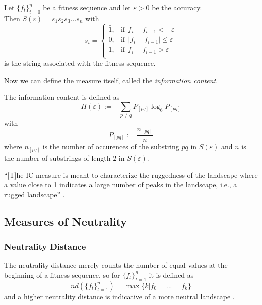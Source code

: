 \documentclass[
  a4paper,  %
  twoside,  %
  bibliography=totoc,
  headsepline,
  cleardoublepage=empty,
  parskip=half,
  draft=false
]{scrbook}
\begin{document}
\begin{definition}\label{def:string}
	Let $\{f_{t}\}_{t = 0}^{n}$ be a fitness sequence and let $\varepsilon > 0$ be the accuracy.\\
	Then $S(\varepsilon) = s_{1}s_{2}s_{3}...s_{n}$ with
	\[
	s_{i} = \left\{
	\begin{array}{ll}
		\bar{1}, & \text{if}\ \ f_{i} - f_{i-1} < -\varepsilon\\
		0, & \text{if}\ \ |f_{i} - f_{i-1}| \leq \varepsilon\\
		1, & \text{if}\ \ f_{i} - f_{i-1} > \varepsilon\\
	\end{array}
	\right.
	\]
	is the string associated with the fitness sequence.
\end{definition}

Now we can define the measure itself, called the \emph{information content}.

\begin{definition}
	The information content is defined as
	\[
	H(\varepsilon) := - \sum_{p \neq q} P_{[pq]} \log_{6} P_{[pq]}
	\]
	with 
	\[
	P_{[pq]} := \frac{n_{[pq]}}{n}
	\]
	where $n_{[pq]}$ is the number of occurences of the substring $pq$ in $S(\varepsilon)$ and $n$ is the number of substrings of length $2$ in $S(\varepsilon)$.
\end{definition}

\enquote{[T]he IC measure is meant to characterize the ruggedness of the landscape where a value close to 1 indicates a large number of peaks in the landscape, i.e., a rugged landscape} \cite{albunian2020causes}.

\subsection{Measures of Neutrality}

\subsubsection{Neutrality Distance}

The neutrality distance merely counts the number of equal values at the beginning of a fitness sequence, so for $\{f_t\}_{t = 1}^{n}$ it is defined as
\begin{equation}
	nd(\{f_t\}_{t = 1}^{n}) = \max \{k | f_0 = ... = f_k\}
\end{equation}
and a higher neutrality distance is indicative of a more neutral landscape \cite{albunian2020causes}.
\end{document}
